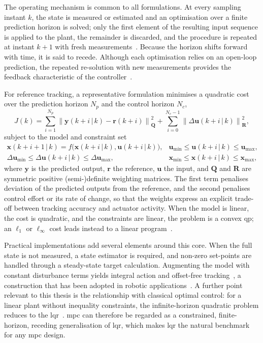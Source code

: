 The operating mechanism is common to all formulations. At every sampling instant $k$, the state is measured or estimated and an optimisation over a finite prediction horizon is solved; only the first element of the resulting input sequence is applied to the plant, the remainder is discarded, and the procedure is repeated at instant $k+1$ with fresh measurements~\cite{bemporad1999,rawlings2000}. Because the horizon shifts forward with time, it is said to recede. Although each optimisation relies on an open-loop prediction, the repeated re-solution with new measurements provides the feedback characteristic of the controller~\cite{bemporad1999}.

For reference tracking, a representative formulation minimises a quadratic cost over the prediction horizon $N_p$ and the control horizon $N_c$,
\begin{equation}\label{eq:mpc-cost}
J(k)=\sum_{i=1}^{N_p}\left\|\mathbf{y}(k+i\,|\,k)-\mathbf{r}(k+i)\right\|_{\mathbf{Q}}^{2}
+\sum_{i=0}^{N_c-1}\left\|\Delta\mathbf{u}(k+i\,|\,k)\right\|_{\mathbf{R}}^{2},
\end{equation}
subject to the model and constraint set
\begin{equation}\label{eq:mpc-problem}
\begin{array}{ll}
\mathbf{x}(k+i+1\,|\,k)=f\big(\mathbf{x}(k+i\,|\,k),\mathbf{u}(k+i\,|\,k)\big), & \mathbf{u}_{\min}\le\mathbf{u}(k+i\,|\,k)\le\mathbf{u}_{\max},\\[1mm]
\Delta\mathbf{u}_{\min}\le\Delta\mathbf{u}(k+i\,|\,k)\le\Delta\mathbf{u}_{\max}, & \mathbf{x}_{\min}\le\mathbf{x}(k+i\,|\,k)\le\mathbf{x}_{\max},
\end{array}
\end{equation}
where $\mathbf{y}$ is the predicted output, $\mathbf{r}$ the reference, $\mathbf{u}$ the input, and $\mathbf{Q}$ and $\mathbf{R}$ are symmetric positive (semi-)definite weighting matrices. The first term penalises deviation of the predicted outputs from the reference, and the second penalises control effort or its rate of change, so that the weights express an explicit trade-off between tracking accuracy and actuator activity. When the model is linear, the cost is quadratic, and the constraints are linear, the problem is a convex \ac{qp}; an $\ell_1$ or $\ell_\infty$ cost leads instead to a linear program~\cite{bemporad1999,rawlings2000}.

Practical implementations add several elements around this core. When the full state is not measured, a state estimator is required, and non-zero set-points are handled through a steady-state target calculation. Augmenting the model with constant disturbance terms yields integral action and offset-free tracking~\cite{rawlings2000}, a construction that has been adopted in robotic applications~\cite{kamel2017}. A further point relevant to this thesis is the relationship with classical optimal control: for a linear plant without inequality constraints, the infinite-horizon quadratic problem reduces to the \ac{lqr}~\cite{rawlings2000}. \ac{mpc} can therefore be regarded as a constrained, finite-horizon, receding generalisation of \ac{lqr}, which makes \ac{lqr} the natural benchmark for any \ac{mpc} design.

